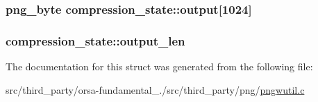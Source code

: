 \subsubsection[{output}]{\setlength{\rightskip}{0pt plus 5cm}png\+\_\+byte compression\+\_\+state\+::output\mbox{[}1024\mbox{]}}\label{structcompression__state_a8f655613a1bad5d242fb0b5a91420609}
\hypertarget{structcompression__state_aea6eff8edf553a973c6fe2b9454d96a0}{}
\subsubsection[{output\+\_\+len}]{ compression\+\_\+state\+::output\+\_\+len}\label{structcompression__state_aea6eff8edf553a973c6fe2b9454d96a0}


The documentation for this struct was generated from the following file\+:\begin{DoxyCompactItemize}
\item 
src/third\+\_\+party/orsa-\/fundamental\+\_./src/third\+\_\+party/png/\hyperlink{pngwutil_8c}{pngwutil.\+c}\end{DoxyCompactItemize}
